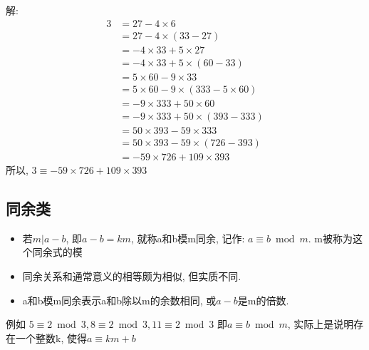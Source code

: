 \documentclass[UTF8]{ctexart}
\begin{document}
    解:
    $$
    \begin{aligned}
        3&=27-4\times 6\\
         &=27-4\times (33-27)\\
         &=-4\times 33+5\times 27\\
         &=-4\times 33+5\times (60-33)\\
         &=5\times 60-9\times 33\\
         &=5\times 60-9\times (333-5\times 60)\\
         &=-9\times 333+50\times 60\\
         &=-9\times 333+50\times (393-333)\\
         &=50\times 393-59\times 333\\
         &=50\times 393-59\times (726-393)\\
         &=-59\times 726+109\times 393
    \end{aligned}
    $$
    所以, $3\equiv -59\times 726+109\times 393$

    \subsection{同余类}
    \begin{itemize}
        \renewcommand{\labelitemi}{\scriptsize$\blacksquare$}
        \item 若$m|a-b$, 即$a-b=km$, 就称a和b模m同余, 记作: $a\equiv b \bmod m$. m被称为这个同余式的模
        \item 同余关系和通常意义的相等颇为相似, 但实质不同.
        \item a和b模m同余表示a和b除以m的余数相同, 或$a-b$是m的倍数.
    \end{itemize}

    例如 $5\equiv 2 \bmod 3, 8\equiv 2 \bmod3, 11\equiv 2 \bmod3$
    即$a\equiv b \bmod m$, 实际上是说明存在一个整数k, 使得$a\equiv km+b$
\end{document}
